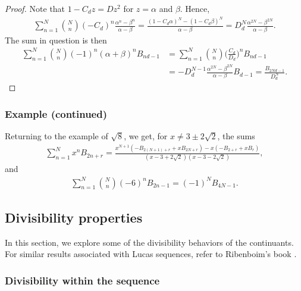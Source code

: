 \documentclass[12pt]{article}
\theoremstyle{plain}
\theoremstyle{definition}
\theoremstyle{remark}
\begin{document}
\begin{proof} Note that $ 1 - C_d z = Dz^2 $ for $ z = \alpha $ and $ \beta $. Hence,
\begin{align*}
	\sum_{n = 1}^N \binom{N}{n} (-C_d)^n \frac{\alpha^n - \beta^n}{\alpha - \beta} = \frac{(1 - C_d \alpha)^N - (1 - C_d \beta)^N}{\alpha - \beta} = D_d^N \frac{\alpha^{2N} - \beta^{2N}}{\alpha - \beta}.
\end{align*}
The sum in question is then
\begin{align*}
	\sum_{n = 1}^N \binom{N}{n} (-1)^n (\alpha + \beta)^n B_{nd - 1} &= \sum_{n = 1}^N \binom{N}{n} \bigg( \frac{C_d}{D_d} \bigg)^n B_{nd - 1} \\
	&= -D_d^{N - 1} \frac{\alpha^{2N} - \beta^{2N}}{\alpha - \beta} B_{d - 1} = \frac{B_{2Nd - 1}}{D_d^N}.
\end{align*}
\end{proof}

\subsubsection{Example (continued)}

Returning to the example of $ \sqrt{8} $, we get, for $ x \neq 3 \pm 2\sqrt{2} $, the sums
\begin{align*}
	\sum_{n = 1}^N x^n B_{2n + r} = \frac{x^{N + 1} (-B_{2(N + 1) + r} + x B_{2N + r}) - x(-B_{2 + r} + x B_r)}{(x - 3 + 2\sqrt{2})(x - 3 - 2\sqrt{2})},
\end{align*}
and
\begin{align*}
	\sum_{n = 1}^N \binom{N}{n} (-6)^n B_{2n - 1} = (-1)^N B_{4N - 1}.
\end{align*}

\subsection{Divisibility properties} \label{Sec:Divisibility_Properties}

In this section, we explore some of the divisibility behaviors of the continuants. For similar results associated with Lucas sequences, refer to Ribenboim's book \cite{Ribenboim_04}.

\subsubsection{Divisibility within the sequence} \label{Sec:Divisibility_within_Sequence}
\end{document}
